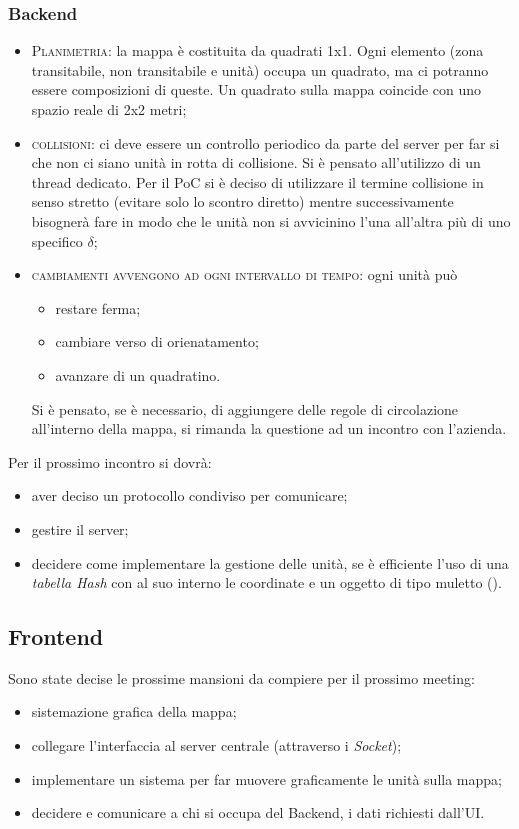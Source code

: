 \subsubsection{Backend}
\begin{itemize}
	\item \textsc{Planimetria}: la mappa è costituita da quadrati 1x1. Ogni elemento (zona transitabile, non transitabile e unità) occupa un quadrato, ma ci potranno essere composizioni di queste. Un quadrato sulla mappa coincide con uno spazio reale di 2x2 metri;
	\item \textsc{collisioni:} ci deve essere un controllo periodico da parte del server per far si che non ci siano unità in rotta di collisione. Si è pensato all'utilizzo di un thread dedicato. Per il PoC si è deciso di utilizzare il termine collisione in senso stretto (evitare solo lo scontro diretto) mentre successivamente bisognerà fare in modo che le unità non si avvicinino l'una all'altra più di uno specifico $\delta$;
	\item \textsc{cambiamenti avvengono ad ogni intervallo di tempo:} ogni unità può 
	\begin{itemize}
		\item restare ferma;
		\item cambiare verso di orienatamento;
		\item avanzare di un quadratino.
	\end{itemize} 
	Si è pensato, se è necessario, di aggiungere delle regole di circolazione all'interno della mappa, si rimanda la questione ad un incontro con l'azienda.
	
		
\end{itemize}
Per il prossimo incontro si dovrà:
\begin{itemize}
	\item aver deciso un protocollo condiviso per comunicare;
	\item gestire il server;
	\item decidere come implementare la gestione delle unità, se è efficiente l'uso di una \textit{tabella Hash} con al suo interno le coordinate e un oggetto di tipo muletto ().
\end{itemize}

\subsection{Frontend}
Sono state decise le prossime mansioni da compiere per il prossimo meeting:
\begin{itemize}
	\item sistemazione grafica della mappa;
	\item collegare l'interfaccia al server centrale (attraverso i \textit{Socket});
	\item implementare un sistema per far muovere graficamente le unità sulla mappa;
	\item decidere e comunicare a chi si occupa del Backend, i dati richiesti dall'UI.
\end{itemize}